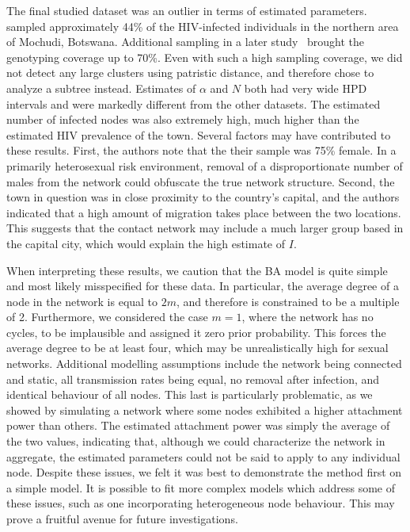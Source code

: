 \documentclass[12pt]{article}\usepackage[]{graphicx}\usepackage[]{color}
\begin{document}
The final studied dataset was an outlier in terms of estimated parameters.
\textcite{novitsky2013phylogenetic} sampled approximately 44\% of the
HIV-infected individuals in the northern area of Mochudi, Botswana. Additional
sampling in a later study~\autocite{novitsky2014impact} brought the genotyping
coverage up to 70\%. Even with such a high sampling coverage, we did not detect
any large clusters using patristic distance, and therefore chose to analyze a
subtree instead. Estimates of $\alpha$ and $N$ both had very wide \gls{HPD}
intervals and were markedly different from the other datasets. The estimated
number of infected nodes was also extremely high, much higher than the
estimated HIV prevalence of the town. Several factors may have contributed to
these results. First, the authors note that the their sample was 75\% female.
In a primarily heterosexual risk environment, removal of a disproportionate
number of males from the network could obfuscate the true network structure.
Second, the town in question was in close proximity to the country's capital,
and the authors indicated that a high amount of migration takes place between
the two locations. This suggests that the contact network may include a much
larger group based in the capital city, which would explain the high estimate
of $I$.

When interpreting these results, we caution that the \gls{BA} model is quite
simple and most likely misspecified for these data. In particular, the average
degree of a node in the network is equal to $2m$, and therefore is constrained
to be a multiple of 2. Furthermore, we considered the case $m = 1$, where the
network has no cycles, to be implausible and assigned it zero prior
probability. This forces the average degree to be at least four, which may be
unrealistically high for sexual networks. Additional modelling assumptions
include the network being connected and static, all transmission rates being
equal, no removal after infection, and identical behaviour of all nodes. This
last is particularly problematic, as we showed by simulating a network where
some nodes exhibited a higher attachment power than others. The estimated
attachment power was simply the average of the two values, indicating that,
although we could characterize the network in aggregate, the estimated
parameters could not be said to apply to any individual node. Despite these
issues, we felt it was best to demonstrate the method first on a simple model.
It is possible to fit more complex models which address some of these issues,
such as one incorporating heterogeneous node behaviour. This may prove a
fruitful avenue for future investigations.
\end{document}
